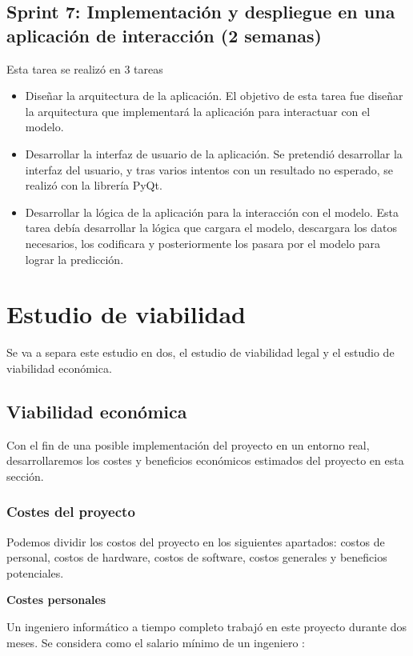 \subsection{Sprint 7: Implementación y despliegue en una aplicación de interacción (2 semanas)}
Esta tarea se realizó en 3 tareas
\begin{itemize}
    \item Diseñar la arquitectura de la aplicación.
    El objetivo de esta tarea fue diseñar la arquitectura que implementará la aplicación para interactuar con el modelo.
    \item Desarrollar la interfaz de usuario de la aplicación.
    Se pretendió desarrollar la interfaz del usuario, y tras varios intentos con un resultado no esperado, se realizó con la librería PyQt.
    \item Desarrollar la lógica de la aplicación para la interacción con el modelo.
    Esta tarea debía desarrollar la lógica que cargara el modelo, descargara los datos necesarios, los codificara y posteriormente los pasara por el modelo para lograr la predicción.
\end{itemize}

\section{Estudio de viabilidad}

Se va a separa este estudio en dos, el estudio de viabilidad legal y el estudio de viabilidad económica.

\subsection{Viabilidad económica}

Con el fin de una posible implementación del proyecto en un entorno real, desarrollaremos los costes y beneficios económicos estimados del proyecto en esta sección.

\subsubsection{Costes del proyecto}

Podemos dividir los costos del proyecto en los siguientes apartados: costos de personal, costos de hardware, costos de software, costos generales y beneficios potenciales.

\textbf{Costes personales}

Un ingeniero informático a tiempo completo trabajó en este proyecto durante dos meses. Se considera como el salario mínimo de un ingeniero \cite{salariogob}:

